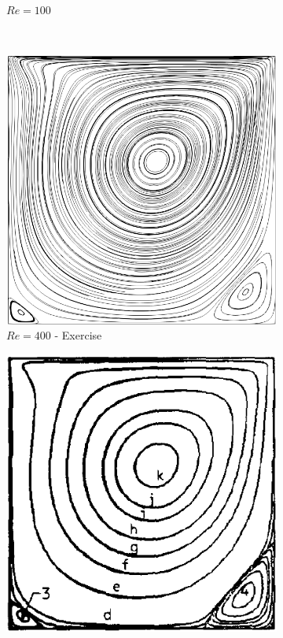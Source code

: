 \begin{figure}[H]
\begin{subfigure}[t]{0.441\textwidth}
        \caption*{$Re = 100$ \parencite{ghia_1982}}
    \end{subfigure}
    \\  %
    \begin{subfigure}[t]{0.450\textwidth}
        \includegraphics[width=\textwidth]{Images/Sub-figures_Example/cavity_400_streamlines.png}
        \caption*{$Re = 400$ - Exercise}
    \end{subfigure}
    \begin{subfigure}[t]{0.438\textwidth}
        \includegraphics[width=\textwidth]{Images/Sub-figures_Example/cavity_400_streamlines_ghia.png}

\end{subfigure}
\end{figure}
